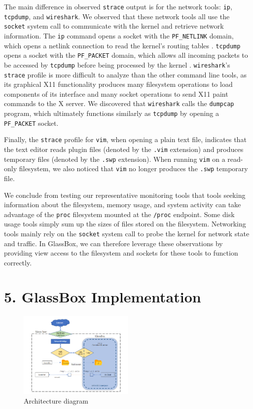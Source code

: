 \documentclass{proc}
\begin{document}
The main difference in observed \texttt{strace} output is for the network tools: \texttt{ip}, \texttt{tcpdump}, and \texttt{wireshark}. We observed that these network tools all use the \texttt{socket} system call to communicate with the kernel and retrieve network information. The \texttt{ip} command opens a socket with the \texttt{PF\_NETLINK} domain, which opens a netlink connection to read the kernel's routing tables \cite{rtnetlinkman}. \texttt{tcpdump} opens a socket with the \texttt{PF\_PACKET} domain, which allows all incoming packets to be accessed by \texttt{tcpdump} before being processed by the kernel \cite{packetman}. \texttt{wireshark}'s \texttt{strace} profile is more difficult to analyze than the other command line tools, as its graphical X11 functionality produces many filesystem operations to load components of its interface and many socket operations to send X11 paint commands to the X server. We discovered that \texttt{wireshark} calls the \texttt{dumpcap} program, which ultimately functions similarly as \texttt{tcpdump} by opening a \texttt{PF\_PACKET} socket.

Finally, the \texttt{strace} profile for \texttt{vim}, when opening a plain text file, indicates that the text editor reads plugin files (denoted by the \texttt{.vim} extension) and produces temporary files (denoted by the \texttt{.swp} extension). When running \texttt{vim} on a read-only filesystem, we also noticed that \texttt{vim} no longer produces the \texttt{.swp} temporary file.

We conclude from testing our representative monitoring tools that tools seeking information about the filesystem, memory usage, and system activity can take advantage of the \texttt{proc} filesystem mounted at the \texttt{/proc} endpoint. Some disk usage tools simply sum up the sizes of files stored on the filesystem. Networking tools mainly rely on the \texttt{socket} system call to probe the kernel for network state and traffic. In GlassBox, we can therefore leverage these observations by providing view access to the filesystem and sockets for these tools to function correctly.

\section*{5. GlassBox Implementation}

\begin{figure}
\includegraphics[width=0.5\textwidth]{architecture}
\caption{Architecture diagram}
\end{figure}
\end{document}
